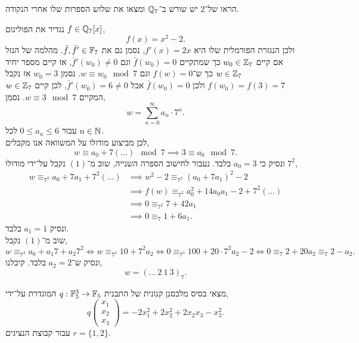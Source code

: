 



\begin{exercise}
	הראו של־$2$ יש שורש ב־$\mathbb{Q}_7$ ומצאו את שלוש הספרות שלו אחרי הנקודה.
\end{exercise}
\begin{solution}
	נגדיר את הפולינום $f \in \mathbb{Q}_7[x]$,
	\[
		f(x)
		= x^2 - 2
	.\]
	ולכן הנגזרת הפורמלית שלו היא $f'(x) = 2x$, נסמן גם את $\bar{f}, \bar{f}' \in \mathbb{F}_7$.
	מהלמה של הנזל אם קיים $w_0 \in \mathbb{Z}_7$ כך שמתקיים $\bar{f}(w_0) = 0$ וגם $\bar{f}'(w_0) \ne 0$,
	אז קיים מספר יחיד $w \in \mathbb{Z}_7$ כך ש־$f(w) = 0$ וגם $w \equiv w_0 \mod 7$.
	נסמן $w_0 = 3$ אז נקבל $f(w_0) = f(3) = 7$ ולכן $\bar{f}(w_0) = 0$ אבל $\bar{f}'(w_0) = 6 \ne 0$,
	לכן קיים $w \in \mathbb{Z}_7$ המקיים $w \equiv 3 \mod 7$.
	נסמן,
	\[
		w
		= \sum_{n = 0}^\infty a_n \cdot 7^n
		\tag{1}
	.\]
	עבור $0 \le a_n \le 6$ לכל $n \in \mathbb{N}$. \\
	לכן מביצוע מודולו על המשוואה אנו מקבלים,
	\[
		w \equiv a_0 + 7 (\ldots) \mod 7
		\implies 3 \equiv a_0 \mod 7
	.\]
	ונסיק כי $a_0 = 3$ בלבד.
	נעבור לחישוב הספרה השנייה, שוב מ־$(1)$ נקבל על־ידי מודולו $7^2$,
	\begin{align*}
		w \equiv_{7^2} a_0 + 7 a_1 + 7^2 (\ldots)
		& \implies w^2 - 2 \equiv_{7^2} {(a_0 + 7 a_1)}^2 - 2 \\
		& \implies f(w) \equiv_{7^2} a_0^2 + 14 a_0 a_1 - 2 + 7^2 (\ldots) \\
		& \implies 0 \equiv_{7^2} 7 + 42 a_1 \\
		& \implies 0 \equiv_7 1 + 6 a_1
	.\end{align*}
	ונסיק $a_1 = 1$ בלבד. \\
	שוב מ־$(1)$ נקבל,
	\[
		w \equiv_{7^3} a_0 + a_1 7 + a_2 7^2
		\iff w \equiv_{7^3} 10 + 7^2 a_2
		\iff 0 \equiv_{7^3} 100 + 20 \cdot 7^2 a_2 - 2
		\iff 0 \equiv_7 2 + 20 a_2 \equiv_7 2 - a_2
	.\]
	ונסיק ש־$a_2 = 2$ בלבד.
	קיבלנו,
	\[
		w
		= {( \ldots\ 2\ 1\ 3 )}_7
	.\]
\end{solution}
\begin{exercise}
	מצאי בסיס מלכסנן קנונית של התבנית $q : \mathbb{F}_5^3 \to \mathbb{F}_5$ המוגדרת על־ידי,
	\[
		q\begin{pmatrix} x_1 \\ x_2 \\ x_3 \end{pmatrix}
		= -2 x_1^2 + 2 x_2^2 + 2 x_2 x_3 - x_3^2
	.\]
	עבור קבוצת הנציגים $r = \{1, 2\}$.
\end{exercise}
